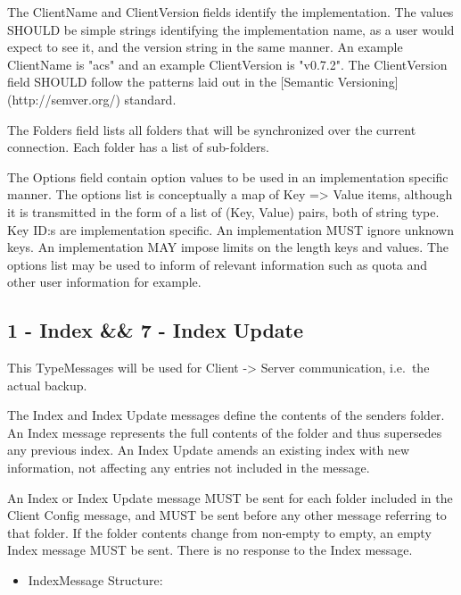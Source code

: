 The ClientName and ClientVersion fields identify the implementation.
The values SHOULD be simple strings identifying the implementation name,
as a user would expect to see it, and the version string in the same
manner. An example ClientName is "acs" and an example ClientVersion is
"v0.7.2". The ClientVersion field SHOULD follow the patterns laid out
in the [Semantic Versioning](http://semver.org/) standard.

The Folders field lists all folders that will be synchronized over the
current connection. Each folder has a list of sub-folders.

The Options field contain option values to be used in an implementation
specific manner. The options list is conceptually a map of Key => Value
items, although it is transmitted in the form of a list of (Key, Value)
pairs, both of string type. Key ID:s are implementation specific. An
implementation MUST ignore unknown keys. An implementation MAY impose
limits on the length keys and values. The options list may be used to
inform of relevant information such as quota and other user information
for example.

\subsection{1 - Index \&\& 7 - Index Update}

This TypeMessages will be used for Client -> Server communication,
i.e.~the actual backup.

The Index and Index Update messages define the contents of the senders
folder. An Index message represents the full contents of the folder and
thus supersedes any previous index. An Index Update amends an existing
index with new information, not affecting any entries not included in
the message.

An Index or Index Update message MUST be sent for each folder included
in the Client Config message, and MUST be sent before any other message
referring to that folder. If the folder contents change from non-empty
to empty, an empty Index message MUST be sent. There is no response to
the Index message.

\begin{itemize}
 \item IndexMessage Structure: 
\end{itemize}

